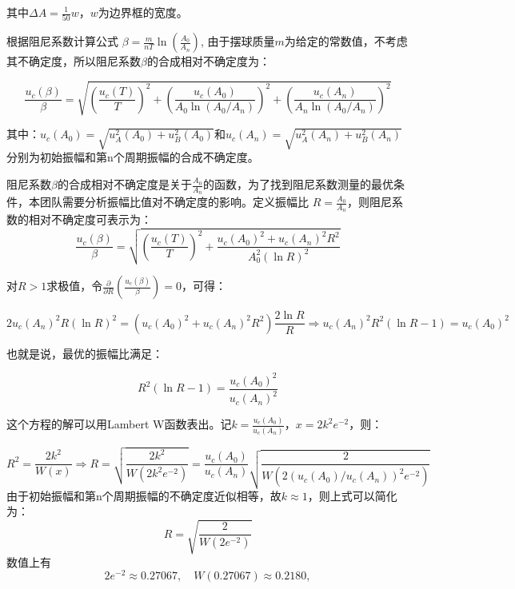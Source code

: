 其中$\Delta A=\frac{1}{50}w$，$w$为边界框的宽度。

根据阻尼系数计算公式 $\beta = \frac{m}{nT}\ln\left(\frac{A_0}{A_n}\right)$,
由于摆球质量$m$为给定的常数值，不考虑其不确定度，所以阻尼系数$\beta$的合成相对不确定度为：

\begin{equation}
\frac{u_c(\beta)}{\beta} = \sqrt{\left(\frac{u_c(T)}{T}\right)^2 + \left(\frac{u_c(A_0)}{A_0 \ln(A_0/A_n)}\right)^2 + \left(\frac{u_c(A_n)}{A_n \ln(A_0/A_n)}\right)^2}
\end{equation}

其中：$u_c(A_0) = \sqrt{u_A^2(A_0) + u_B^2(A_0)}$和$u_c(A_n) = \sqrt{u_A^2(A_n) + u_B^2(A_n)}$分别为初始振幅和第n个周期振幅的合成不确定度。

阻尼系数$\beta$的合成相对不确定度是关于$\frac{A_0}{A_n}$的函数，为了找到阻尼系数测量的最优条件，本团队需要分析振幅比值对不确定度的影响。定义振幅比 $R = \frac{A_0}{A_n}$，则阻尼系数的相对不确定度可表示为：
    \begin{equation}
        \frac{u_c(\beta)}{\beta} = \sqrt{\left(\frac{u_c(T)}{T}\right)^2 + \frac{u_c(A_0)^2 + u_c(A_n)^2R^2}{A_0^2 (\ln R)^2}}
    \end{equation}
    
    对$R > 1$求极值，令$\frac{\partial}{\partial R}\left(\frac{u_c(\beta)}{\beta}\right) = 0$，可得：
    
    \begin{equation}
        2u_c(A_n)^2R (\ln R)^2 = (u_c(A_0)^2 + u_c(A_n)^2R^2)\frac{2\ln R}{R} \Rightarrow u_c(A_n)^2R^2 (\ln R - 1) = u_c(A_0)^2
    \end{equation}
    
    也就是说，最优的振幅比满足：
    
    \begin{equation}
        R^2(\ln R-1) = \frac{u_c(A_0)^2}{u_c(A_n)^2}
    \end{equation}
    
    这个方程的解可以用Lambert W函数\textsuperscript{\cite{R1996On}}表出。记$k = \frac{u_c(A_0)}{u_c(A_n)}$，$x = 2k^2e^{-2}$，则：
    
    \begin{equation}
        R^2 = \frac{2k^2}{W(x)} \Rightarrow R = \sqrt{\frac{2k^2}{W(2k^2e^{-2})}} = \frac{u_c(A_0)}{u_c(A_n)}\sqrt{\frac{2}{W(2(u_c(A_0)/u_c(A_n))^2e^{-2})}}
    \end{equation}
    由于初始振幅和第n个周期振幅的不确定度近似相等，故$k \approx 1$，则上式可以简化为：
    \begin{equation}
        R = \sqrt{\frac{2}{W(2e^{-2})}}
    \end{equation}
    数值上有
    \begin{equation}
        2e^{-2} \approx 0.27067, \quad W(0.27067) \approx 0.2180,
    \end{equation}
    

